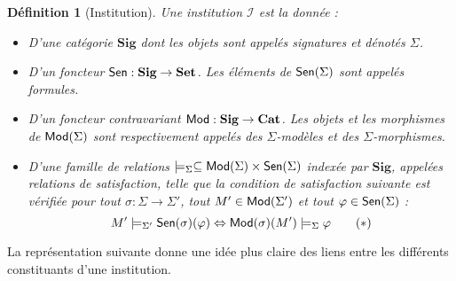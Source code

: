 \documentclass[11pt,a4paper]{article}
\newtheorem{defi}[theo]{Définition}
\newcommand{\ph}{\varphi}
\newcommand{\itemz}{\item[$\triangleright$]}
\newcommand{\gr}{\textbf}
\newcommand{\I}{\mathcal{I}}
\renewcommand{\iff}{\Leftrightarrow}
\newcommand{\info}[1]{\text{{\fontfamily{lmss}\selectfont #1}}}
\newcommand{\Mod}{\info{Mod}}
\newcommand{\Sen}{\info{Sen}}
\newcommand{\1}{\mathbbm{1}}
\begin{document}
\begin{defi}[Institution]
Une institution $\I$ est la donnée :
\begin{itemize}
\setlength\itemsep{-0.3em}
\itemz D'une catégorie $\gr{Sig}$ dont les objets sont appelés signatures et dénotés $\Sigma$.
\itemz D'un foncteur $\Sen : \gr{Sig} \to \gr{Set}$. Les éléments de $\Sen (\Sigma)$ sont appelés formules.
\itemz D'un foncteur contravariant $\Mod : \gr{Sig} \to \gr{Cat}$. Les objets et les morphismes de $\Mod(\Sigma)$ sont respectivement appelés des $\Sigma$-modèles et des $\Sigma$-morphismes.
\itemz D'une famille de relations $\models_\Sigma \subseteq \Mod(\Sigma) \times \Sen(\Sigma)$ indexée par $\gr{Sig}$, appelées relations de satisfaction, telle que la condition de satisfaction suivante est vérifiée pour tout $\sigma : \Sigma \to \Sigma'$, tout $M' \in \Mod(\Sigma')$ et tout $\ph \in \Sen(\Sigma)$ :
\begin{equation} M' \models_{\Sigma'} \Sen(\sigma)(\ph) \iff \Mod(\sigma)(M') \models_{\Sigma} \ph \label{condsat} \tag{$\ast$} \end{equation}
\end{itemize}
\end{defi}
La représentation suivante donne une idée plus claire des liens entre les différents constituants d'une institution.
\begin{center}
\end{center}
\end{document}
